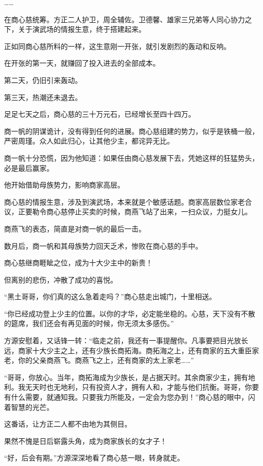 \begin{this_body}
……

在商心慈统筹。方正二人护卫，周全辅佐。卫德馨、雄家三兄弟等人同心协力之下，关于演武场的情报生意，终于搭建起来。

正如同商心慈所料的一样，这生意刚一开张，就引发剧烈的轰动和反响。

在开张的第一天，就赚回了投入进去的全部成本。

第二天，仍旧引来轰动。

第三天，热潮还未退去。

足足七天之后，商心慈的三十万元石，已经增长至四十四万。

商一帆的阴谋诡计，没有得到任何的进展。商心慈组建的势力，似乎是铁桶一般，严密周瑾。众人如此归心，让其他少主，都诧异无比。

商一帆十分恐慌，因为他知道：如果任由商心慈发展下去，凭她这样的狂猛势头，必是最后赢家。

他开始借助母族势力，影响商家高层。

商心慈的情报生意，涉及到演武场，本来就是个敏感话题。商家高层数位家老合议，正要勒令商心慈停止买卖的时候，商燕飞站了出来，一扫众议，力挺女儿。

商燕飞的表态，简直是对商一帆的最后一击。

数月后，商一帆和其母族势力回天乏术，惨败在商心慈的手中。

商心慈继商睚眦之位，成为十大少主中的新贵！

但离别的悲伤，冲散了成功的喜悦。

“黑土哥哥，你们真的这么急着走吗？”商心慈走出城门，十里相送。

“你已经成功登上少主的位置。以你的才华，必定能坐稳的。心慈，天下没有不散的筵席，我们还会有再见面的时候，你无须太多感伤。”

方源安慰着，又话锋一转：“临走之前，我还有一事提醒你。凡事要把目光放长远，商家十大少主之上，还有少族长商拓海。商拓海之上，还有商家的五大重臣家老，你的父亲商燕飞。商燕飞之上，还有商家的太上家老……”

“哥哥，你放心。当年，商拓海成为少族长，是占据天时。其余商家少主，拥有地利。我无天时也无地利，只有投资人才，拥有人和，才能与他们抗衡。哥哥，你要有什么需要，就通知我。只要我力所能及，一定会为您办到！”商心慈的眼中，闪着智慧的光芒。

这番话，让方正二人都不由地为其侧目。

果然不愧是日后崭露头角，成为商家族长的女才子！

“好，后会有期。”方源深深地看了商心慈一眼，转身就走。


\end{this_body}
